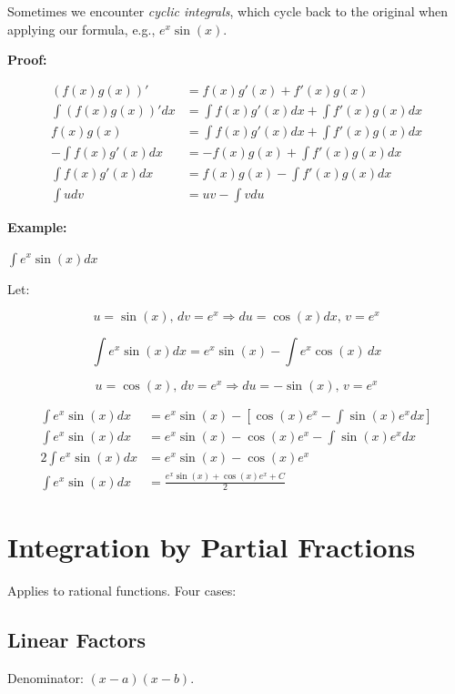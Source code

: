 Sometimes we encounter \emph{cyclic integrals}, which cycle back to the original when applying our 
formula, e.g., \(e^x \sin(x)\).

\textbf{Proof:}

\begin{align*}
    (f(x)g(x))' &= f(x)g'(x) + f'(x)g(x) \\ 
    \int (f(x)g(x))' dx &= \int f(x)g'(x)dx + \int f'(x)g(x) dx\\ 
    f(x)g(x)  &= \int f(x)g'(x)dx + \int f'(x)g(x) dx\\ 
    -  \int f(x)g'(x)dx &= - f(x)g(x)  + \int f'(x)g(x) dx\\ 
    \int f(x)g'(x)dx &=  f(x)g(x)  - \int f'(x)g(x) dx \\ 
    \int u dv &=  uv - \int v du
\end{align*}

\QED

\textbf{Example:}

\(\int e^x \sin(x)dx\)

Let:

\[
    u = \sin (x), \, dv = e^x \Rightarrow du = \cos (x)dx, \, v = e^x
\]

\[
    \int e^x \sin(x)dx = e^x \sin (x) - \int e^x \cos(x)\,dx 
\]

\[
    u = \cos(x), \, dv = e^x \Rightarrow du = -\sin(x), \, v = e^x
\]

\begin{align*}
    \int e^x \sin(x)dx &= e^x \sin (x) - \left[\cos(x)e^x - \int \sin(x)e^x dx \right] \\
    \int e^x \sin(x)dx &= e^x \sin (x) - \cos(x)e^x - \int \sin(x)e^x dx \\
    2\int e^x \sin(x)dx &= e^x \sin (x) - \cos(x)e^x \\
    \int e^x \sin(x)dx &= \frac{e^x \sin (x) +\cos(x)e^x + C}{2}
\end{align*}

\section{Integration by Partial Fractions}

Applies to rational functions. Four cases:

\subsection{Linear Factors}

Denominator: \((x - a)(x - b)\).


